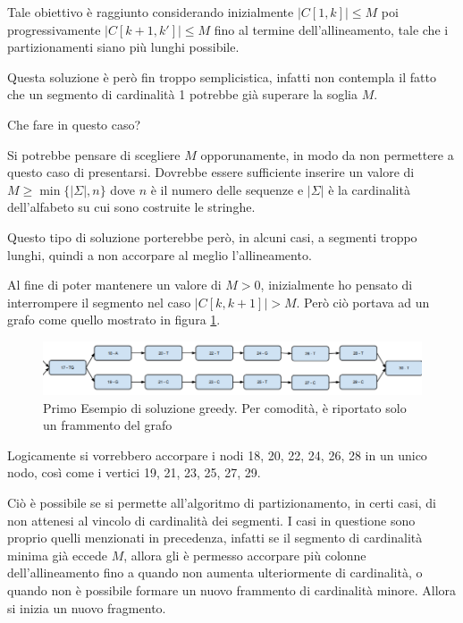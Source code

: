 Tale obiettivo è raggiunto considerando inizialmente $|C[1,k]| \leq M$ poi progressivamente $|C[k+1,k']| \leq M$ fino al termine dell'allineamento, tale che i partizionamenti siano più lunghi possibile.

Questa soluzione è però fin troppo semplicistica, infatti non contempla il fatto che un segmento di cardinalità 1 potrebbe già superare la soglia $M$. 

Che fare in questo caso?

Si potrebbe pensare di scegliere $M$ opporunamente, in modo da non permettere a questo caso di presentarsi. Dovrebbe essere sufficiente inserire un valore di $M \geq \min \{|\Sigma|,n\}$ dove $n$ è il numero delle sequenze e $|\Sigma|$ è la cardinalità dell'alfabeto su cui sono costruite le stringhe.

Questo tipo di soluzione porterebbe però, in alcuni casi, a segmenti troppo lunghi, quindi a non accorpare al meglio l'allineamento.

Al fine di poter mantenere un valore di $M>0$, inizialmente ho pensato di interrompere il segmento nel caso $|C[k,k+1]| > M$. Però ciò portava ad un grafo come quello mostrato in figura \ref{fig:primo_esempio_splicing_graph_greedy}.

\begin{figure}
    \centering
    \includegraphics[scale=0.7]{images/greedy1.PNG}
    \caption{Primo Esempio di soluzione greedy. Per comodità, è riportato solo un frammento del grafo}
    \label{fig:primo_esempio_splicing_graph_greedy}
\end{figure}

Logicamente si vorrebbero accorpare i nodi 18, 20, 22, 24, 26, 28 in un unico nodo, così come i vertici 19, 21, 23, 25, 27, 29.

Ciò è possibile se si permette all'algoritmo di partizionamento, in certi casi, di non attenesi al vincolo di cardinalità dei segmenti. I casi in questione sono proprio quelli menzionati in precedenza, infatti se il segmento di cardinalità minima già eccede $M$, allora gli è permesso accorpare più colonne dell'allineamento fino a quando non aumenta ulteriormente di cardinalità, o quando non è possibile formare un nuovo frammento di cardinalità minore. Allora si inizia un nuovo fragmento.

